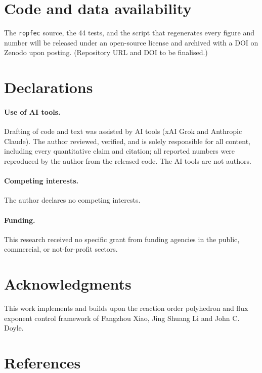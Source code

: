 \documentclass[11pt]{article}
\begin{document}
\section*{Code and data availability}

The \texttt{ropfec} source, the 44 tests, and the script that regenerates every
figure and number will be released under an open-source license and archived with
a DOI on Zenodo upon posting. (Repository URL and DOI to be finalised.)

\section*{Declarations}

\paragraph{Use of AI tools.} Drafting of code and text was assisted by AI tools
(xAI Grok and Anthropic Claude). The author reviewed, verified, and is solely
responsible for all content, including every quantitative claim and citation; all
reported numbers were reproduced by the author from the released code. The AI
tools are not authors.

\paragraph{Competing interests.} The author declares no competing interests.

\paragraph{Funding.} This research received no specific grant from funding
agencies in the public, commercial, or not-for-profit sectors.

\section*{Acknowledgments}

This work implements and builds upon the reaction order polyhedron and flux
exponent control framework of Fangzhou Xiao, Jing Shuang Li and John C. Doyle.

\section*{References}
\end{document}
